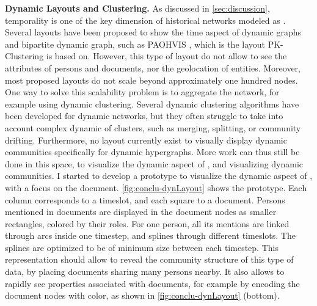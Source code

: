 \noindent\textbf{Dynamic Layouts and Clustering.} As discussed in \autoref{sec:discussion}, temporality is one of the key dimension of historical networks modeled as \modelplural.
Several layouts have been proposed to show the time aspect of dynamic graphs and bipartite dynamic graph, such as PAOHVIS \cite{valdiviaAnalyzingDynamicHypergraphs2021}, which is the layout PK-Clustering is based on.
However, this type of layout do not allow to see the attributes of persons and documents, nor the geolocation of entities.
Moreover, most proposed layouts do not scale beyond approximately one hundred nodes.
One way to solve this scalability problem is to aggregate the network, for example using dynamic clustering.
Several dynamic clustering algorithms have been developed for dynamic networks, but they often struggle to take into account complex dynamic of clusters, such as merging, splitting, or community drifting.
Furthermore, no layout currently exist to visually display dynamic communities specifically for dynamic hypergraphs.
More work can thus still be done in this space, to visualize the dynamic aspect of \modelplural, and visualizing dynamic communities.
I started to develop a prototype to visualize the dynamic aspect of \modelplural, with a focus on the document.
\autoref{fig:conclu-dynLayout} shows the prototype.
Each column corresponds to a timeslot, and each square to a document.
Persons mentioned in documents are displayed in the document nodes as smaller rectangles, colored by their roles.
For one person, all its mentions are linked through arcs inside one timestep, and splines through different timeslots.
The splines are optimized to be of minimum size between each timestep.
This representation should allow to reveal the community structure of this type of data, by placing documents sharing many persons nearby.
It also allows to rapidly see properties associated with documents, for example by encoding the document nodes with color, as shown in \autoref{fig:conclu-dynLayout} (bottom).

